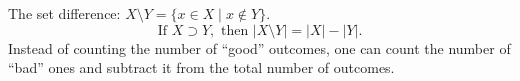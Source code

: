 

\setcounter{section}{1}
\setcounter{subsection}{3}
\setcounter{dfn}{2}

The set difference: $X \setminus Y = \{x \in X \mid x \notin Y\}$.
\[
\text{If }X \supset Y, \text{ then } |X \setminus Y| = |X| - |Y|.
\]
Instead of counting the number of ``good'' outcomes,
one can count the number of ``bad'' ones and subtract it from the total number of outcomes.



